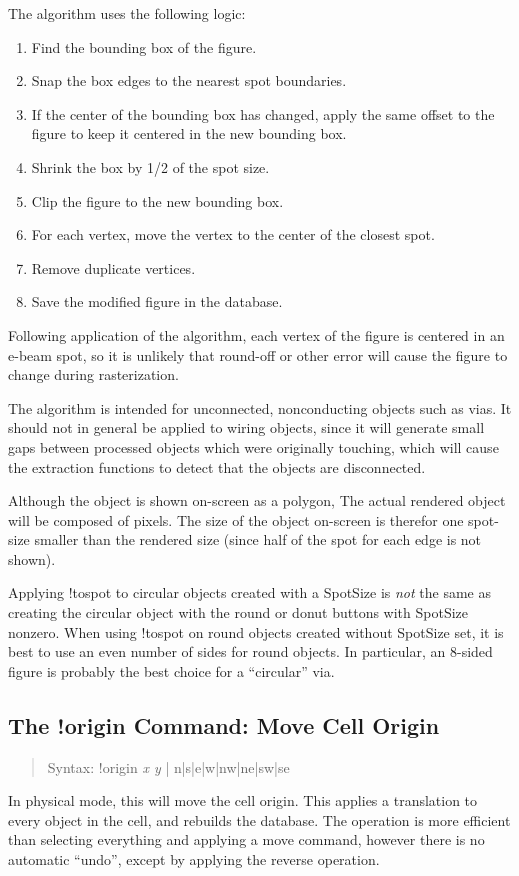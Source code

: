 The algorithm uses the following logic:

\begin{enumerate}
\item{Find the bounding box of the figure.}
\item{Snap the box edges to the nearest spot boundaries.}
\item{If the center of the bounding box has changed, apply the same offset
    to the figure to keep it centered in the new bounding box.}
\item{Shrink the box by 1/2 of the spot size.}
\item{Clip the figure to the new bounding box.}
\item{For each vertex, move the vertex to the center of the closest spot.}
\item{Remove duplicate vertices.}
\item{Save the modified figure in the database.}
\end{enumerate}

Following application of the algorithm, each vertex of the figure is
centered in an e-beam spot, so it is unlikely that round-off or other
error will cause the figure to change during rasterization.

The algorithm is intended for unconnected, nonconducting objects such
as vias.  It should not in general be applied to wiring objects, since
it will generate small gaps between processed objects which were
originally touching, which will cause the extraction functions to
detect that the objects are disconnected.

Although the object is shown on-screen as a polygon, The actual
rendered object will be composed of pixels.  The size of the object
on-screen is therefor one spot-size smaller than the rendered size
(since half of the spot for each edge is not shown).

Applying {\cb !tospot} to circular objects created with a {\et
SpotSize} is {\it not} the same as creating the circular object with
the {\cb round} or {\cb donut} buttons with {\et SpotSize} nonzero. 
When using {\cb !tospot} on round objects created without {\et
SpotSize} set, it is best to use an even number of sides for round
objects.  In particular, an 8-sided figure is probably the best choice
for a ``circular'' via.

\subsection{The {\cb !origin} Command: Move Cell Origin}
\begin{quote}
Syntax: {\vt !origin} {\it x y\/} {\vt | n|s|e|w|nw|ne|sw|se}
\end{quote}
In physical mode, this will move the cell origin.  This applies a
translation to every object in the cell, and rebuilds the database. 
The operation is more efficient than selecting everything and applying
a move command, however there is no automatic ``undo'', except by
applying the reverse operation.
    
